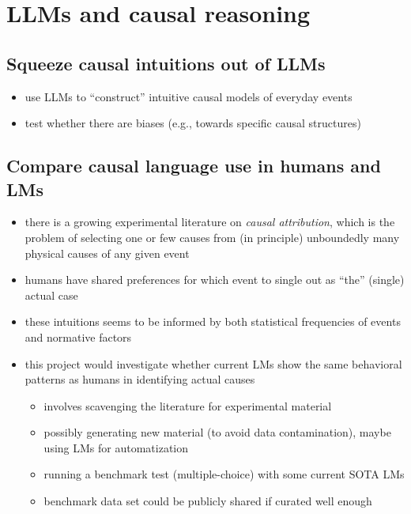 \documentclass[fleqn,reqno,10pt]{article}
\begin{document}


\section{LLMs and causal reasoning}

\subsection{Squeeze causal intuitions out of LLMs}

\begin{itemize}
  \item use LLMs to ``construct'' intuitive causal models of everyday events
  \item test whether there are biases (e.g., towards specific causal structures)
\end{itemize}


\subsection{Compare causal language use in humans and LMs}

\begin{itemize}
  \item there is a growing experimental literature on \emph{causal attribution}, which is the problem of selecting one or few causes from (in principle) unboundedly many physical causes of any given event
  \item humans have shared preferences for which event to single out as ``the'' (single) actual case
  \item these intuitions seems to be informed by both statistical frequencies of events and normative factors \citep{IcardKominsky2017:Normality-and-a,QuillienLucas2023:Counterfactuals}
  \item this project would investigate whether current LMs show the same behavioral patterns as humans in identifying actual causes
  \begin{itemize}
    \item involves scavenging the literature for experimental material
    \item possibly generating new material (to avoid data contamination), maybe using LMs for automatization
    \item running a benchmark test (multiple-choice) with some current SOTA LMs
    \item benchmark data set could be publicly shared if curated well enough
  \end{itemize}
\end{itemize}
\end{document}
